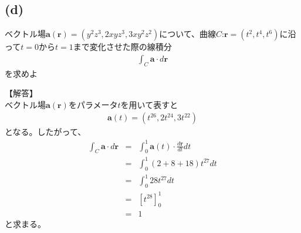 \documentclass[pdflatex,ja=standard,fleqn]{bxjsarticle}
\begin{document}
\subsection*{(d)}
\begin{screen}
    ベクトル場$\boldsymbol{a}(\boldsymbol{r})=(y^2z^3,2xyz^3,3xy^2z^2)$について、曲線$C$:$\boldsymbol{r}=(t^2,t^4,t^6)$に沿って$t=0$から$t=1$まで変化させた際の線積分
    \begin{eqnarray*}
        \int_C \boldsymbol{a}\cdot d\boldsymbol{r}
    \end{eqnarray*}
    を求めよ
\end{screen}
【解答】\\
ベクトル場$\boldsymbol{a}(\boldsymbol{r})$をパラメータ$t$を用いて表すと
\begin{eqnarray*}
    \boldsymbol{a}(t)=(t^{26},2t^{24},3t^{22})
\end{eqnarray*}
となる。したがって、
\begin{eqnarray*}
    \int_C \boldsymbol{a}\cdot d\boldsymbol{r}&=&\int_{0}^{1} \boldsymbol{a}(t)\cdot\frac{d\boldsymbol{r}}{dt}dt\\
    &=&\int_{0}^{1} (2+8+18)t^{27}dt\\
    &=&\int_{0}^{1} 28t^{27}dt\\
    &=&\left[t^{28}\right]_{0}^{1}\\
    &=&1
\end{eqnarray*}
と求まる。
\end{document}
